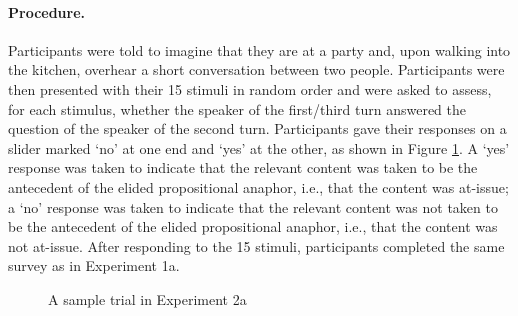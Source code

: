 \documentclass[11pt,fleqn]{article}
\newcommand{\6}{\mbox{$[\hspace*{-.6mm}[$}}
\newcommand{\9}{\mbox{$]\hspace*{-.6mm}]$}}
\begin{document}
\paragraph{Procedure.} Participants were told to imagine that they are at a party and, upon walking into the kitchen, overhear a short conversation between two people. Participants were then presented with their 15 stimuli in random order and were asked to assess, for each stimulus, whether the speaker of the first/third turn answered the question of the speaker of the second turn. Participants gave their responses on a slider marked `no' at one end and `yes' at the other, as shown in Figure \ref{f-trial-exp2a}. A `yes' response was taken to indicate that the relevant content was taken to be the antecedent of the elided propositional anaphor, i.e., that the content was at-issue; a `no' response was taken to indicate that the relevant content was not taken to be the antecedent of the elided propositional anaphor, i.e., that the content was not at-issue.
After responding to the 15 stimuli, participants completed the same survey as in Experiment 1a.


\begin{figure}[!h]
\begin{center}
\end{center}
\caption{A sample trial in Experiment 2a}
\label{f-trial-exp2a}
\end{figure}
\end{document}
